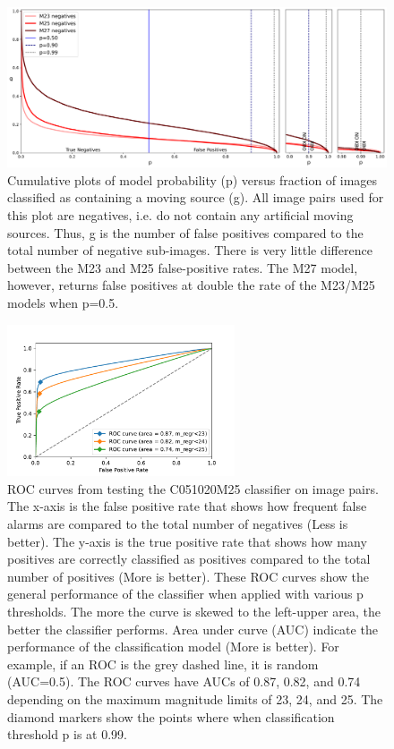 \begin{figure}[ht]
    \centering
    \includegraphics[width=\textwidth,keepaspectratio]{Figures/completeness_negatives.png}
    \caption{Cumulative plots of model probability (p) versus fraction of images classified as  containing a moving source (g).  
    All image pairs used for this plot are negatives, i.e. do not contain any artificial moving sources.
    Thus, g is the number of false positives compared to the total number of negative sub-images.
    There is very little difference between the M23 and M25 false-positive rates.
    The M27 model, however, returns false positives at double the rate of the M23/M25 models when p=0.5.}
    \label{fig:negatives}
\end{figure}
\setlength{\tabcolsep}{6pt}

\begin{figure}[ht]
    \centering
    \includegraphics[width=0.6\textwidth,keepaspectratio]{Figures/ROC.pdf}
    \caption{ROC curves from testing the C051020M25 classifier on image pairs.
    The x-axis is the false positive rate that shows how frequent false alarms are compared to the total number of negatives (Less is better).
    The y-axis is the true positive rate that shows how many positives are correctly classified as positives compared to the total number of positives (More is better).
    These ROC curves show the general performance of the classifier when applied with various p thresholds.
    The more the curve is skewed to the left-upper area, the better the classifier performs.
    Area under curve (AUC) indicate the performance of the classification model (More is better).
    For example, if an ROC is the grey dashed line, it is random (AUC=0.5).
    The ROC curves have AUCs of 0.87, 0.82, and 0.74 depending on the maximum magnitude limits of 23, 24, and 25.
    The diamond markers show the points where when classification threshold p is at 0.99.
    }
    \label{fig:ROC}
\end{figure}

